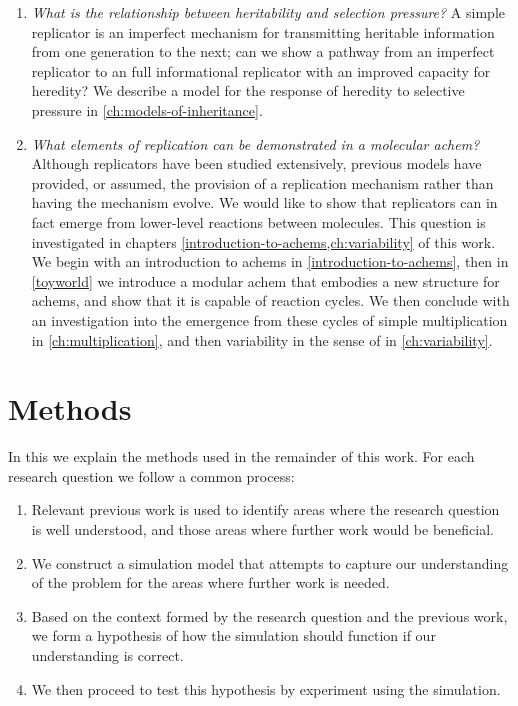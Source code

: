 \begin{enumerate}[label=RQ\arabic*:]
	
	\item \emph{What is the relationship between heritability and selection pressure?} A simple replicator is an imperfect mechanism for transmitting heritable information from one generation to the next; can we show a pathway from an imperfect replicator to an full informational replicator with an improved capacity for heredity? We describe a model for the response of heredity to selective pressure in \cref{ch:models-of-inheritance}.
	
	\item \emph{What elements of replication can be demonstrated in a molecular \gls{achem}?} Although replicators have been studied extensively, previous models have provided, or assumed, the provision of a replication mechanism rather than having the mechanism evolve. We would like to show that replicators can in fact emerge from lower-level reactions between molecules. This question is investigated in chapters \cref{introduction-to-achems,ch:variability} of this work. We begin with an introduction to \glspl{achem} in \cref{introduction-to-achems}, then in \cref{toyworld} we introduce a modular \gls{achem} that embodies a new structure for \glspl{achem}, and show that it is capable of reaction cycles. We then conclude with an investigation into the emergence from these cycles of simple multiplication in \cref{ch:multiplication}, and then variability in the sense of \textcite{Zachar2010} in \cref{ch:variability}.

\end{enumerate}

\section{Methods}\label{methods}

In this  we explain the methods used in the remainder of this work. For each research question we follow a common process:
\begin{enumerate}
	\item Relevant previous work is used to identify areas where the research question is well understood, and those areas where further work would be beneficial.
	\item We construct a simulation model that attempts to capture our understanding of the problem for the areas where further work is needed.
	\item Based on the context formed by the research question and the previous work, we form a hypothesis of how the simulation should function if our understanding is correct.
	\item We then proceed to test this hypothesis by experiment using the simulation.
\end{enumerate}

